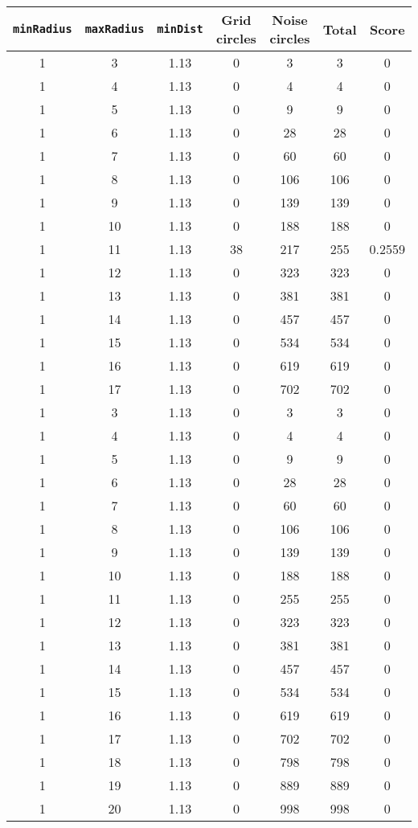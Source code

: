 \documentclass[letterpaper, 12pt]{article}
\begin{document}
\begin{longtable}{|c|c|c|c|c|c|c|}
\hline
\textbf{\texttt{minRadius}} & \textbf{\texttt{maxRadius}} & \textbf{\texttt{minDist}} & \textbf{Grid circles} & \textbf{Noise circles} & \textbf{Total} & \textbf{Score} \\
\hline
1 & 3 & 1.13 & 0 & 3 & 3 & 0 \\
\hline
1 & 4 & 1.13 & 0 & 4 & 4 & 0 \\
\hline
1 & 5 & 1.13 & 0 & 9 & 9 & 0 \\
\hline
1 & 6 & 1.13 & 0 & 28 & 28 & 0 \\
\hline
1 & 7 & 1.13 & 0 & 60 & 60 & 0 \\
\hline
1 & 8 & 1.13 & 0 & 106 & 106 & 0 \\
\hline
1 & 9 & 1.13 & 0 & 139 & 139 & 0 \\
\hline
1 & 10 & 1.13 & 0 & 188 & 188 & 0 \\
\hline
1 & 11 & 1.13 & 38 & 217 & 255 & 0.2559 \\
\hline
1 & 12 & 1.13 & 0 & 323 & 323 & 0 \\
\hline
1 & 13 & 1.13 & 0 & 381 & 381 & 0 \\
\hline
1 & 14 & 1.13 & 0 & 457 & 457 & 0 \\
\hline
1 & 15 & 1.13 & 0 & 534 & 534 & 0 \\
\hline
1 & 16 & 1.13 & 0 & 619 & 619 & 0 \\
\hline
1 & 17 & 1.13 & 0 & 702 & 702 & 0 \\
\hline
1 & 3 & 1.13 & 0 & 3 & 3 & 0 \\
\hline
1 & 4 & 1.13 & 0 & 4 & 4 & 0 \\
\hline
1 & 5 & 1.13 & 0 & 9 & 9 & 0 \\
\hline
1 & 6 & 1.13 & 0 & 28 & 28 & 0 \\
\hline
1 & 7 & 1.13 & 0 & 60 & 60 & 0 \\
\hline
1 & 8 & 1.13 & 0 & 106 & 106 & 0 \\
\hline
1 & 9 & 1.13 & 0 & 139 & 139 & 0 \\
\hline
1 & 10 & 1.13 & 0 & 188 & 188 & 0 \\
\hline
1 & 11 & 1.13 & 0 & 255 & 255 & 0 \\
\hline
1 & 12 & 1.13 & 0 & 323 & 323 & 0 \\
\hline
1 & 13 & 1.13 & 0 & 381 & 381 & 0 \\
\hline
1 & 14 & 1.13 & 0 & 457 & 457 & 0 \\
\hline
1 & 15 & 1.13 & 0 & 534 & 534 & 0 \\
\hline
1 & 16 & 1.13 & 0 & 619 & 619 & 0 \\
\hline
1 & 17 & 1.13 & 0 & 702 & 702 & 0 \\
\hline
1 & 18 & 1.13 & 0 & 798 & 798 & 0 \\
\hline
1 & 19 & 1.13 & 0 & 889 & 889 & 0 \\
\hline
1 & 20 & 1.13 & 0 & 998 & 998 & 0 \\
\hline
\end{longtable}
\end{document}
